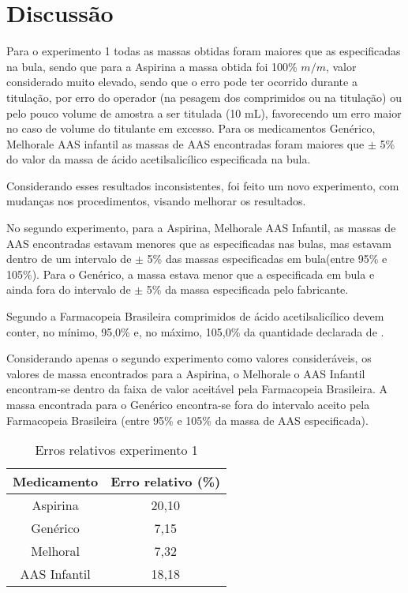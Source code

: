 \chapter{Discussão}

Para o experimento 1 todas as massas obtidas foram maiores que as especificadas na bula, sendo que
para a Aspirina\R \; a massa obtida foi 100\% $m/m$, valor considerado muito elevado, sendo que o
erro pode ter ocorrido durante a titulação, por erro do operador (na pesagem dos comprimidos ou na
titulação) ou pelo pouco volume de amostra a ser titulada (10 mL), favorecendo um erro maior no caso
de volume do titulante em excesso. Para os medicamentos Genérico, Melhoral\R e AAS infantil as massas
de AAS encontradas foram maiores que $\pm$ 5\% do valor da massa de ácido acetilsalicílico
especificada na bula.

Considerando esses resultados inconsistentes, foi feito um novo experimento, com mudanças nos
procedimentos, visando melhorar os resultados.

 No segundo experimento, para a Aspirina\R, Melhoral\R e AAS Infantil, as massas de AAS encontradas
 estavam menores que as especificadas nas bulas, mas estavam dentro de um intervalo de $\pm$ 5\% das
 massas especificadas em bula(entre 95\% e 105\%). Para o Genérico, a massa estava menor que a
 especificada em bula e ainda fora do intervalo de $\pm$ 5\% da massa especificada pelo fabricante.

 Segundo a Farmacopeia Brasileira \cite{Farmacopeia2010} comprimidos de ácido acetilsalicílico devem
 conter, no mínimo, 95,0\% e, no máximo, 105,0\% da quantidade declarada de .

 Considerando apenas o segundo experimento como valores consideráveis, os valores de massa
 encontrados para a Aspirina\R, o Melhoral\R e o AAS Infantil encontram-se dentro da faixa de valor
 aceitável pela Farmacopeia Brasileira. A massa encontrada para o Genérico encontra-se fora do
 intervalo aceito pela Farmacopeia Brasileira (entre 95\% e 105\% da massa de AAS especificada).

 \begin{table}[H]\label{err_exp1}
     \centering
\begin{tabular}{c c}
    \toprule
    \textbf{Medicamento} & \textbf{Erro relativo (\%)} \\
    \midrule
    Aspirina\R & 20,10 \\
    Genérico & 7,15 \\
    Melhoral\R & 7,32 \\
    AAS Infantil & 18,18\\
    \bottomrule
\end{tabular}
\caption{Erros relativos experimento 1}
 \end{table}

